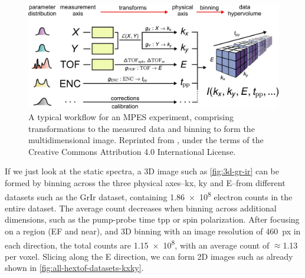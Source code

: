 \begin{figure}[h]
    \centering
    \includegraphics[width=1\linewidth]{images/41597_2020_769_Fig2_HTML.png}
    \caption{A typical workflow for an \gls{MPES} experiment, comprising transformations to the measured data and binning to form the multidimensional image. Reprinted from \cite{xianOpensourceEndtoendWorkflow2020}, under the terms of the Creative Commons Attribution 4.0 International License.}
    \label{fig:mpes_workflow}
\end{figure}

If we just look at the static spectra, a 3D image such as \cref{fig:3d-gr-ir} can be formed by binning across the three physical axes--\gls{kx}, \gls{ky} and \gls{E}--from different datasets such as the \gls{GrIr} dataset, containing \num{1.86e8} electron counts in the entire dataset. The average count decreases when binning across additional dimensions, such as the pump-probe time \gls{tpp} or spin polarization. After focusing on a region (\gls{EF} and near), and 3D binning with an image resolution of \qty{460}{px} in each direction, the total counts are \num{1.15e8}, with an average count of $\approx$\num{1.13} per voxel. Slicing along the \gls{E} direction, we can form 2D images such as already shown in \cref{fig:all-hextof-datasets-kxky}.


